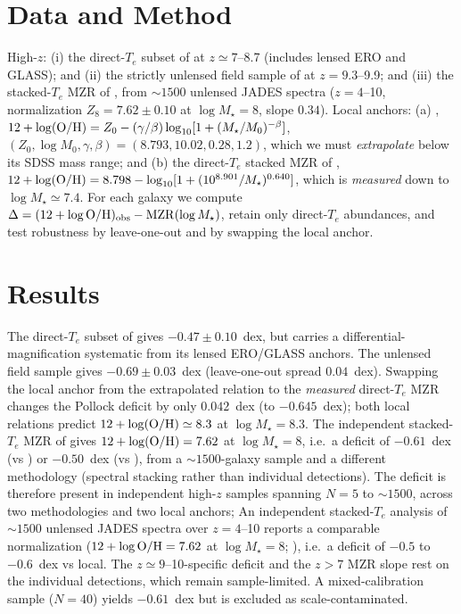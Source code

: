 \documentclass[twocolumn]{aastex631}
\begin{document}
\section{Data and Method}
High-$z$: (i) the direct-$T_e$ subset of \citet{nakajima23} at $z\simeq7$--8.7 (includes lensed ERO and
GLASS); and (ii) the strictly unlensed field sample of \citet{pollock26} at $z=9.3$--9.9; and (iii) the stacked-$T_e$ MZR
of \citet{isobe26}, from $\sim1500$ unlensed JADES spectra ($z=4$--10, normalization $Z_8=7.62\pm0.10$ at
$\log M_\star=8$, slope $0.34$). Local anchors:
(a) \citet{curti20}, $12+\log({\rm O/H})=Z_0-(\gamma/\beta)\log_{10}[1+(M_\star/M_0)^{-\beta}]$,
$(Z_0,\log M_0,\gamma,\beta)=(8.793,10.02,0.28,1.2)$, which we must \emph{extrapolate} below its SDSS mass
range; and (b) the direct-$T_e$ stacked MZR of \citet{am13},
$12+\log({\rm O/H})=8.798-\log_{10}[1+(10^{8.901}/M_\star)^{0.640}]$, which is \emph{measured} down to
$\log M_\star\simeq7.4$. For each galaxy we compute $\Delta=(12+\log{\rm O/H})_{\rm obs}-{\rm MZR}(\log M_\star)$,
retain only direct-$T_e$ abundances, and test robustness by leave-one-out and by swapping the local anchor.

\section{Results}
The direct-$T_e$ subset of \citet{nakajima23} gives $-0.47\pm0.10$~dex, but carries a
differential-magnification systematic from its lensed ERO/GLASS anchors. The unlensed \citet{pollock26}
field sample gives $-0.69\pm0.03$~dex (leave-one-out spread $0.04$~dex). Swapping the local anchor from the
extrapolated \citet{curti20} relation to the \emph{measured} direct-$T_e$ \citet{am13} MZR changes the
Pollock deficit by only $0.042$~dex (to $-0.645$~dex); both local relations predict
$12+\log({\rm O/H})\simeq8.3$ at $\log M_\star=8.3$. The independent stacked-$T_e$ MZR of \citet{isobe26} gives $12+\log({\rm O/H})=7.62$ at
$\log M_\star=8$, i.e.\ a deficit of $-0.61$~dex (vs \citealt{curti20}) or $-0.50$~dex (vs \citealt{am13}),
from a $\sim1500$-galaxy sample and a different methodology (spectral stacking rather than individual
detections). The deficit is therefore present in independent high-$z$ samples spanning $N=5$ to
$\sim1500$, across two methodologies and two local anchors; An independent stacked-$T_e$ analysis of $\sim1500$ unlensed JADES spectra over $z=4$--10 reports a
comparable normalization ($12+\log{\rm O/H}=7.62$ at $\log M_\star=8$; \citealt{isobe26}), i.e.\ a deficit
of $-0.5$ to $-0.6$~dex vs local. The $z\simeq9$--10-specific deficit and the $z>7$ MZR slope rest on the
individual \citet{pollock26} detections, which remain sample-limited. A mixed-calibration sample ($N=40$) yields
$-0.61$~dex but is excluded as scale-contaminated.
\end{document}
